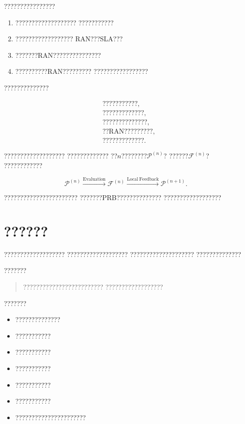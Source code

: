 ????????????????

\begin{enumerate}[label=\arabic*)]
    \item ???????????????????
    ???????????
    \item ??????????????????
    RAN???SLA???
    \item ???????RAN???????????????
    \item ??????????RAN?????????
    ?????????????????
\end{enumerate}

??????????????

\begin{equation}
\boxed{
\begin{aligned}
&\text{???????????},\\
&\text{?????????????},\\
&\text{??????????????},\\
&\text{??RAN?????????},\\
&\text{?????????????}.
\end{aligned}
}
\label{eq:implemented_decision_methods}
\end{equation}

???????????????????
?????????????
??$n$????????$\mathcal{P}^{(n)}$?
??????$\mathcal{F}^{(n)}$?
????????????

\begin{equation}
\mathcal{P}^{(n)}
\xrightarrow{\mathrm{Evaluation}}
\mathcal{F}^{(n)}
\xrightarrow{\mathrm{Local\ Feedback}}
\mathcal{P}^{(n+1)}.
\label{eq:policy_feedback_loop}
\end{equation}

???????????????????????
???????PRB??????????????
??????????????????


\section{??????}
\label{sec:business_intent_extraction}

???????????????????
???????????????????
????????????????????
??????????????

???????

\begin{quote}
?????????????????????????
??????????????????
\end{quote}

???????

\begin{itemize}
    \item ??????????????
    \item ???????????
    \item ???????????
    \item ???????????
    \item ???????????
    \item ???????????
    \item ??????????????????????
\end{itemize}

